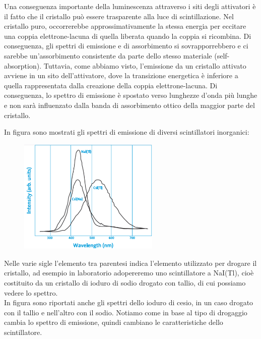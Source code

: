 Una conseguenza importante della luminescenza attraverso i siti degli attivatori è il fatto che il cristallo può essere trasparente alla luce di scintillazione. Nel cristallo puro, occorrerebbe approssimativamente la stessa energia per eccitare una coppia elettrone-lacuna di quella liberata quando la coppia si ricombina. Di conseguenza, gli spettri di emissione e di assorbimento si sovrapporrebbero e ci sarebbe un'assorbimento consistente da parte dello stesso materiale (self-absorption). Tuttavia, come abbiamo visto, l'emissione da un cristallo attivato avviene in un sito dell'attivatore, dove la transizione energetica è inferiore a quella rappresentata dalla creazione della coppia elettrone-lacuna. Di conseguenza, lo spettro di emissione è spostato verso lunghezze d'onda più lunghe e non sarà influenzato dalla banda di assorbimento ottico della maggior parte del cristallo.

\begin{esempio}
   In figura sono mostrati gli spettri di emissione di diversi scintillatori inorganici:
   \begin{figure}[H]
      \centering
      \includegraphics[width=0.6\textwidth]{immagini/spettri_emissione_scintillatori_inorganici.png}
   \end{figure}
   Nelle varie sigle l'elemento tra parentesi indica l'elemento utilizzato per drogare il cristallo, ad esempio in laboratorio adopereremo uno scintillatore a NaI(Tl), cioè costituito da un cristallo di ioduro di sodio drogato con tallio, di cui possiamo vedere lo spettro.\\
   In figura sono riportati anche gli spettri dello ioduro di cesio, in un caso drogato con il tallio e nell'altro con il sodio. Notiamo come in base al tipo di drogaggio cambia lo spettro di emissione, quindi cambiano le caratteristiche dello scintillatore.
\end{esempio}

